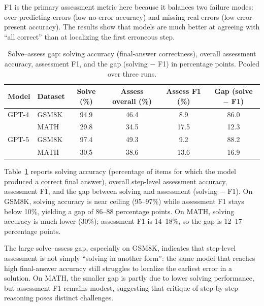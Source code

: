 F1 is the primary assessment metric here because it balances two failure modes: over-predicting errors (low no-error accuracy) and missing real errors (low error-present accuracy). The results show that models are much better at agreeing with ``all correct'' than at localizing the first erroneous step.


\begin{table}[t]
\centering
\caption{Solve--assess gap: solving accuracy (final-answer correctness), overall assessment accuracy, assessment F1, and the gap (solving $-$ F1) in percentage points. Pooled over three runs.}
\label{tab:solve-assess-gap}
\begin{tabular}{llcccc}
\toprule
Model & Dataset & Solve (\%) & Assess overall (\%) & Assess F1 (\%) & Gap (solve $-$ F1) \\
\midrule
GPT-4  & GSM8K & 94.9 & 46.4 & 8.9 & 86.0 \\
       & MATH  & 29.8 & 34.5 & 17.5 & 12.3 \\
GPT-5  & GSM8K & 97.4 & 49.3 & 9.2 & 88.2 \\
       & MATH  & 30.5 & 38.6 & 13.6 & 16.9 \\
\bottomrule
\end{tabular}
\end{table}

Table~\ref{tab:solve-assess-gap} reports solving accuracy (percentage of items for which the model produced a correct final answer), overall step-level assessment accuracy, assessment F1, and the gap between solving and assessment (solving $-$ F1). On GSM8K, solving accuracy is near ceiling (95--97\%) while assessment F1 stays below 10\%, yielding a gap of 86--88 percentage points. On MATH, solving accuracy is much lower (30\%); assessment F1 is 14--18\%, so the gap is 12--17 percentage points.

The large solve--assess gap, especially on GSM8K, indicates that step-level assessment is not simply ``solving in another form'': the same model that reaches high final-answer accuracy still struggles to localize the earliest error in a solution. On MATH, the smaller gap is partly due to lower solving performance, but assessment F1 remains modest, suggesting that critique of step-by-step reasoning poses distinct challenges.

